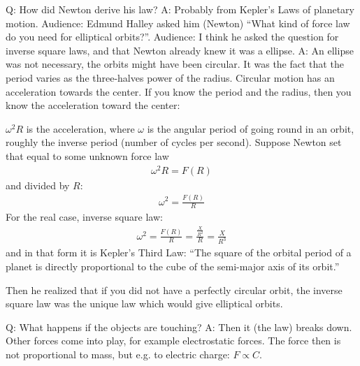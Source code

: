 \documentclass[pagesize,headsepline,10pt,parskip=half,BCOR=12mm]{scrreprt}
\newenvironment{aside}
{\begin{mdframed}[style=0,%
  leftline=false,rightline=false,leftmargin=2em,rightmargin=2em,%
  innerleftmargin=0pt,innerrightmargin=0pt,linewidth=0.75pt,%
  skipabove=7pt,skipbelow=7pt]\small}
{\end{mdframed}}
\newcommand{\eg}{\mbox{e.g.}\xspace}
\begin{document}
        \begin{aside}
          Q: How did Newton derive his law? A: Probably from
          Kepler's Laws of planetary motion. Audience: Edmund Halley
          asked him (Newton) ``What kind of force law do you need for
          elliptical orbits?''. Audience: I think he asked the
          question for inverse square laws, and that Newton already
          knew it was a ellipse.
          A: An ellipse was not necessary, the orbits might have been
          circular.  It was the fact that the period varies as the
          three-halves power of the radius. Circular motion has an
          acceleration towards the center. If you know the period and
          the radius, then you know the acceleration toward the
          center:

          $\omega^2 R$ is the acceleration, where $\omega$ is the
          angular period of going round in an orbit, roughly the
          inverse period (number of cycles per second).  Suppose
          Newton set that equal to some unknown force law
          \begin{align}
            \omega^2 R = F(R)
          \end{align}
          and divided by $R$:
          \begin{align}
            \omega^2 = \frac{F(R)}{R}
          \end{align}
          For the real case, inverse square law:
          \begin{align}
            \omega^2 = \frac{F(R)}{R} = \frac{\frac{X}{R^2}}{R} =
            \frac{X}{R^3}
          \end{align}
          and in that form it is Kepler's Third Law: ``The square of
          the orbital period of a planet is directly proportional to
          the cube of the semi-major axis of its orbit.''

          Then he realized that if you did not have a perfectly
          circular orbit, the inverse square law was the unique law
          which would give elliptical orbits.
        \end{aside}

        \begin{aside}
          Q: What happens if the objects are touching? A: Then it
          (the law) breaks down. Other forces come into play, for
          example electrostatic forces. The force then is not
          proportional to mass, but \eg to electric charge: $F
          \propto C$.
        \end{aside}
\end{document}

